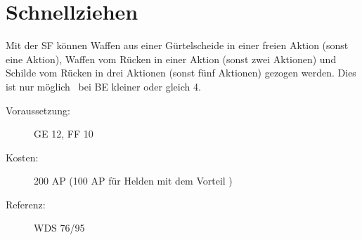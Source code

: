 \section{Schnellziehen}
\label{sf.schnellziehen}
Mit der SF  können Waffen aus einer Gürtelscheide in einer freien Aktion (sonst eine Aktion), Waffen vom Rücken in einer Aktion (sonst zwei Aktionen) und Schilde vom Rücken in drei Aktionen (sonst fünf Aktionen) gezogen werden.
Dies ist nur möglich \ bei BE kleiner oder gleich 4.
\begin{description}
    \item[Voraussetzung:]
        GE 12, FF 10
    \item [Kosten:]
        200 AP (100 AP für Helden mit dem Vorteil )
    \item [Referenz:]
        WDS 76/95
\end{description}
